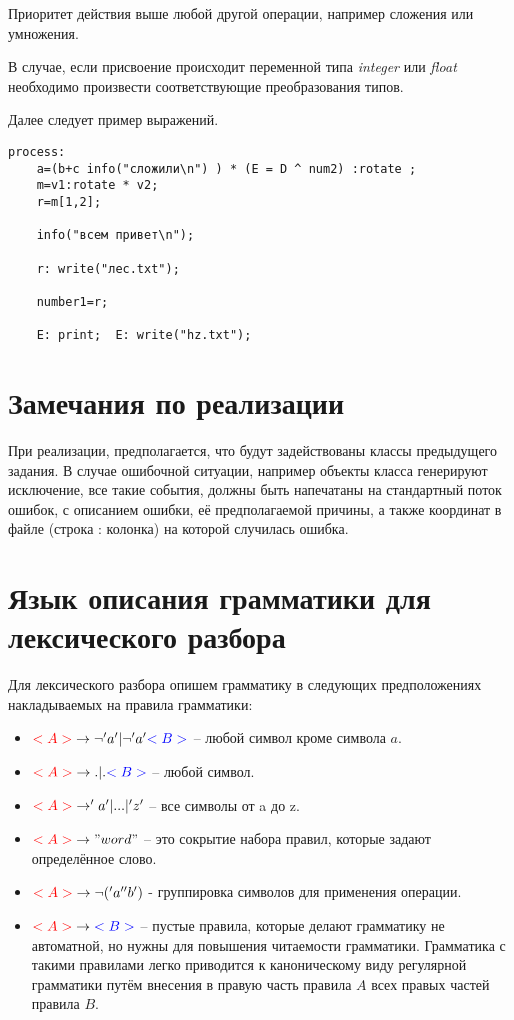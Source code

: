 \documentclass[a4paper,11pt]{article}
\newcommand{\ns}[1]{\textcolor{blue}{<#1>}}
\newcommand{\ls}[1]{\textcolor{red}{<#1>}}
\begin{document}
Приоритет действия выше любой другой операции, например сложения или
умножения.

В случае, если присвоение происходит переменной типа \textit{integer}
или \textit{float} необходимо произвести соответствующие преобразования 
типов.

Далее следует пример выражений.

\begin{verbatim}
process:
    a=(b+c info("сложили\n") ) * (E = D ^ num2) :rotate ;
    m=v1:rotate * v2;
    r=m[1,2];

    info("всем привет\n");

    r: write("лес.txt");

    number1=r;

    E: print;  E: write("hz.txt");

\end{verbatim}

\section{Замечания по реализации}

При реализации, предполагается, что будут задействованы классы предыдущего
задания. В случае ошибочной ситуации, например объекты класса генерируют
исключение, все такие события, должны быть напечатаны на стандартный поток 
ошибок, с описанием ошибки, её предполагаемой причины, а также координат 
в файле (строка : колонка) на которой случилась ошибка.


\section{Язык описания грамматики для лексического разбора}

Для лексического разбора опишем грамматику в следующих предположениях накладываемых
на правила грамматики:
\begin{itemize}
    \item $\ls{A} \to \neg {'a'} | \neg {'a'} \ns{B}$ -- любой символ кроме 
        символа $a$.
    \item $\ls{A} \to . | . \ns{B}$ -- любой символ.
    \item $\ls{A} \to 'a' | ... | 'z'$ -- все символы от a до z.
    \item $\ls{A} \to "word"$ -- это сокрытие набора правил, 
        которые задают определённое слово.
    \item $\ls{A} \to \neg('a''b')$ - группировка символов для применения операции.
    \item $\ls{A} \to \ns{B} $ -- пустые правила, которые делают грамматику 
        не автоматной, но нужны для повышения читаемости грамматики.
        Грамматика с такими правилами легко приводится к каноническому 
        виду регулярной грамматики путём внесения в правую часть правила $A$
        всех правых частей правила $B$.
\end{itemize}
\end{document}
